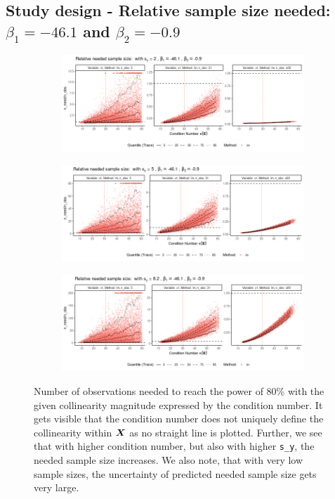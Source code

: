 \documentclass[11pt,a4paper,twoside]{book}\usepackage[]{graphicx}\usepackage[]{xcolor}
\begin{document}
\subsection{Study design - Relative sample size needed: $\beta_1=-46.1$ and $\beta_2=-0.9$}
\begin{figure}[H]
\centering
\begin{subfigure}[b]{1\textwidth}
\vspace*{-0.5cm}
\includegraphics[width=1\textwidth]{../fromsim/simres_nrel1-1.png}
\end{subfigure}
\begin{subfigure}[b]{1\textwidth}
\vspace*{-1cm}
\includegraphics[width=1\textwidth]{../fromsim/simres_nrel2-1.png}
\end{subfigure}
\begin{subfigure}[b]{1\textwidth}
\vspace*{-1cm}
\includegraphics[width=1\textwidth]{../fromsim/simres_nrel3-1.png}
\end{subfigure}
\caption{Number of observations needed to reach the power of 80\% with the given collinearity magnitude expressed by the condition number. It gets visible that the condition number does not uniquely define the collinearity within ${\boldsymbol{X}}$ as no straight line is plotted. Further, we see that with higher condition number, but also with higher \texttt{s\_y}, the needed sample size increases. We also note, that with very low sample sizes, the uncertainty of predicted needed sample size gets very large.}
\label{fig:simres_nrel1}
\end{figure}
\end{document}
